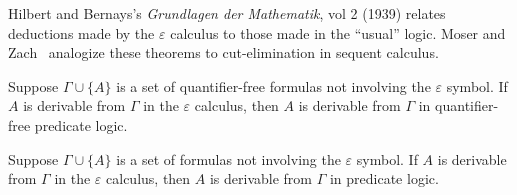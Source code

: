 \begin{node}\label{epsilon-calc-0009}%
Hilbert and Bernays's \textit{Grundlagen der Mathematik}, vol 2 (1939)
relates deductions made by the $\varepsilon$ calculus to those made in
the ``usual'' logic. Moser and Zach~\cite{Moser2006epsilon}
analogize these theorems to cut-elimination in sequent calculus.

\begin{theorem}\label{epsilon-calc-000A}%
Suppose $\Gamma\cup\{A\}$ is a set of quantifier-free formulas not
involving the $\varepsilon$ symbol. If $A$ is derivable from $\Gamma$ in
the $\varepsilon$ calculus, then $A$ is derivable from $\Gamma$ in
quantifier-free predicate logic.
\end{theorem}

\begin{theorem}\label{epsilon-calc-000B}%
Suppose $\Gamma\cup\{A\}$ is a set of formulas not involving the
$\varepsilon$ symbol. If $A$ is derivable from $\Gamma$ in the
$\varepsilon$ calculus, then $A$ is derivable from $\Gamma$ in predicate
logic.
\end{theorem}
\end{node}
